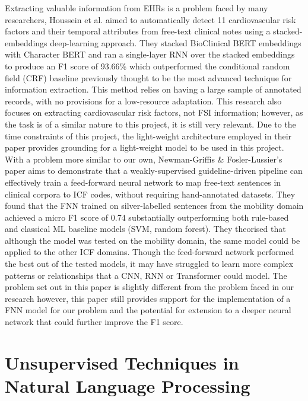 Extracting valuable information from EHRs is a problem faced by many researchers, Houssein et al. \cite{houssein2023} aimed to automatically detect 11 cardiovascular risk factors and their temporal attributes from free-text clinical notes using a stacked-embeddings deep-learning approach. They stacked BioClinical BERT embeddings with Character BERT and ran a single-layer RNN over the stacked embeddings to produce an F1 score of 93.66\% which outperformed the conditional random field (CRF) baseline previously thought to be the most advanced technique for information extraction. This method relies on having a large sample of annotated records, with no provisions for a low-resource adaptation. This research also focuses on extracting cardiovascular risk factors, not FSI information; however, as the task is of a similar nature to this project, it is still very relevant. Due to the time constraints of this project, the light-weight architecture employed in their paper provides grounding for a light-weight model to be used in this project. \\

With a problem more similar to our own, Newman-Griffis \& Fosler-Lussier’s paper \cite{newman-griffis2020auto} aims to demonstrate that a weakly-supervised guideline-driven pipeline can effectively train a feed-forward neural network to map free-text sentences in clinical corpora to ICF codes, without requiring hand-annotated datasets. They found that the FNN trained on silver-labelled sentences from the mobility domain achieved a micro F1 score of 0.74 substantially outperforming both rule-based and classical ML baseline models (SVM, random forest). They theorised that although the model was tested on the mobility domain, the same model could be applied to the other ICF domains. Though the feed-forward network performed the best out of the tested models, it may have struggled to learn more complex patterns or relationships that a CNN, RNN or Transformer could model. The problem set out in this paper is slightly different from the problem faced in our research however, this paper still provides support for the implementation of a FNN model for our problem and the potential for extension to a deeper neural network that could further improve the F1 score.

\section{Unsupervised Techniques in Natural Language Processing}


